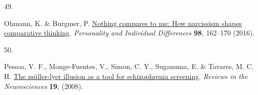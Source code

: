 \documentclass[
  man,floatsintext]{apa6}
\newlength{\cslhangindent}
\newlength{\csllabelwidth}
\newlength{\cslentryspacingunit} %
\newenvironment{CSLReferences}[2] %
 {%
  \setlength{\parindent}{0pt}
  \ifodd #1
  \let\oldpar\par
  \def\par{\hangindent=\cslhangindent\oldpar}
  \fi
  \setlength{\parskip}{#2\cslentryspacingunit}
 }%
 {}
\newcommand{\CSLLeftMargin}[1]{\parbox[t]{\csllabelwidth}{#1}}
\newcommand{\CSLRightInline}[1]{\parbox[t]{\linewidth - \csllabelwidth}{#1}\break}
\begin{document}
\begin{CSLReferences}{0}{0}
\leavevmode{}%
\CSLLeftMargin{49. }%
\CSLRightInline{Ohmann, K. \& Burgmer, P. \href{https://doi.org/10.1016/j.paid.2016.03.069}{Nothing compares to me: How narcissism shapes comparative thinking}. \emph{Personality and Individual Differences} \textbf{98}, 162--170 (2016).}

\leavevmode{}%
\CSLLeftMargin{50. }%
\CSLRightInline{Pessoa, V. F., Monge-Fuentes, V., Simon, C. Y., Suganuma, E. \& Tavares, M. C. H. \href{https://doi.org/10.1515/REVNEURO.2008.19.2-3.91}{The müller-lyer illusion as a tool for schizophrenia screening}. \emph{Reviews in the Neurosciences} \textbf{19}, (2008).}

\end{CSLReferences}


\clearpage
\renewcommand{\listfigurename}{Figure captions}
\end{document}
